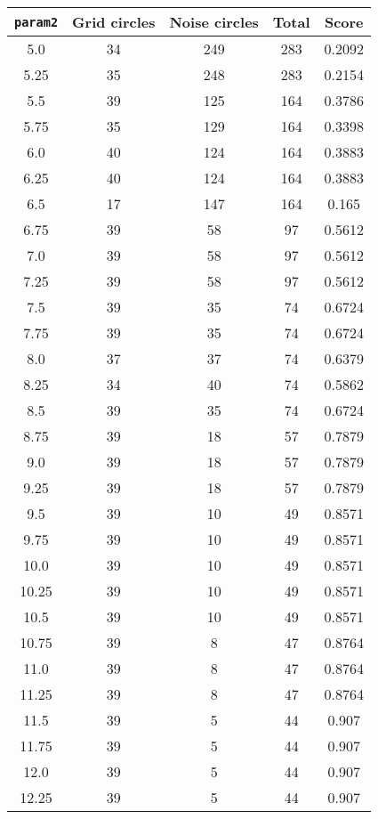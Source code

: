 \documentclass[letterpaper, 12pt]{article}
\begin{document}
\begin{longtable}{|c|c|c|c|c|}
\hline
\textbf{\texttt{param2}} & \textbf{Grid circles} & \textbf{Noise circles} & \textbf{Total} & \textbf{Score} \\
\hline
5.0 & 34 & 249 & 283 & 0.2092 \\
\hline
5.25 & 35 & 248 & 283 & 0.2154 \\
\hline
5.5 & 39 & 125 & 164 & 0.3786 \\
\hline
5.75 & 35 & 129 & 164 & 0.3398 \\
\hline
6.0 & 40 & 124 & 164 & 0.3883 \\
\hline
6.25 & 40 & 124 & 164 & 0.3883 \\
\hline
6.5 & 17 & 147 & 164 & 0.165 \\
\hline
6.75 & 39 & 58 & 97 & 0.5612 \\
\hline
7.0 & 39 & 58 & 97 & 0.5612 \\
\hline
7.25 & 39 & 58 & 97 & 0.5612 \\
\hline
7.5 & 39 & 35 & 74 & 0.6724 \\
\hline
7.75 & 39 & 35 & 74 & 0.6724 \\
\hline
8.0 & 37 & 37 & 74 & 0.6379 \\
\hline
8.25 & 34 & 40 & 74 & 0.5862 \\
\hline
8.5 & 39 & 35 & 74 & 0.6724 \\
\hline
8.75 & 39 & 18 & 57 & 0.7879 \\
\hline
9.0 & 39 & 18 & 57 & 0.7879 \\
\hline
9.25 & 39 & 18 & 57 & 0.7879 \\
\hline
9.5 & 39 & 10 & 49 & 0.8571 \\
\hline
9.75 & 39 & 10 & 49 & 0.8571 \\
\hline
10.0 & 39 & 10 & 49 & 0.8571 \\
\hline
10.25 & 39 & 10 & 49 & 0.8571 \\
\hline
10.5 & 39 & 10 & 49 & 0.8571 \\
\hline
10.75 & 39 & 8 & 47 & 0.8764 \\
\hline
11.0 & 39 & 8 & 47 & 0.8764 \\
\hline
11.25 & 39 & 8 & 47 & 0.8764 \\
\hline
11.5 & 39 & 5 & 44 & 0.907 \\
\hline
11.75 & 39 & 5 & 44 & 0.907 \\
\hline
12.0 & 39 & 5 & 44 & 0.907 \\
\hline
12.25 & 39 & 5 & 44 & 0.907 \\
\hline

\end{longtable}
\end{document}
